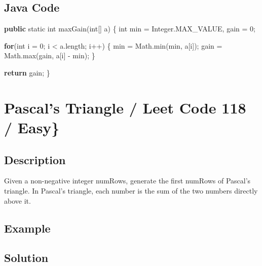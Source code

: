 \documentclass[]{book}
\newenvironment{Shaded}{\begin{snugshade}}{\end{snugshade}}
\newcommand{\BuiltInTok}[1]{#1}
\newcommand{\DataTypeTok}[1]{\textcolor[rgb]{0.13,0.29,0.53}{#1}}
\newcommand{\DecValTok}[1]{\textcolor[rgb]{0.00,0.00,0.81}{#1}}
\newcommand{\FunctionTok}[1]{\textcolor[rgb]{0.00,0.00,0.00}{#1}}
\newcommand{\KeywordTok}[1]{\textcolor[rgb]{0.13,0.29,0.53}{\textbf{#1}}}
\newcommand{\NormalTok}[1]{#1}
\begin{document}
\hypertarget{java-code-8}{%
\subsection{Java Code}\label{java-code-8}}

\begin{Shaded}
\begin{Highlighting}[]
\KeywordTok{public} \DataTypeTok{static} \DataTypeTok{int} \FunctionTok{maxGain}\NormalTok{(}\DataTypeTok{int}\NormalTok{[] a) \{}
    \DataTypeTok{int}\NormalTok{ min = }\BuiltInTok{Integer}\NormalTok{.}\FunctionTok{MAX_VALUE}\NormalTok{, gain = }\DecValTok{0}\NormalTok{;}

    \KeywordTok{for}\NormalTok{(}\DataTypeTok{int}\NormalTok{ i = }\DecValTok{0}\NormalTok{; i < a.}\FunctionTok{length}\NormalTok{; i++) \{}
\NormalTok{        min = }\BuiltInTok{Math}\NormalTok{.}\FunctionTok{min}\NormalTok{(min, a[i]);}
\NormalTok{        gain = }\BuiltInTok{Math}\NormalTok{.}\FunctionTok{max}\NormalTok{(gain, a[i] - min);}
\NormalTok{    \}}

    \KeywordTok{return}\NormalTok{ gain;}
\NormalTok{\}}
\end{Highlighting}
\end{Shaded}

\hypertarget{pascals-triangle-leet-code-118-easy}{%
\section{Pascal's Triangle / Leet Code 118 / Easy\}}\label{pascals-triangle-leet-code-118-easy}}

\hypertarget{description-10}{%
\subsection{Description}\label{description-10}}

Given a non-negative integer numRows, generate the first numRows of Pascal's triangle. In Pascal's triangle, each
number is the sum of the two numbers directly above it.

\hypertarget{example-9}{%
\subsection{Example}\label{example-9}}

\hypertarget{solution-8}{%
\subsection{Solution}\label{solution-8}}
\end{document}
